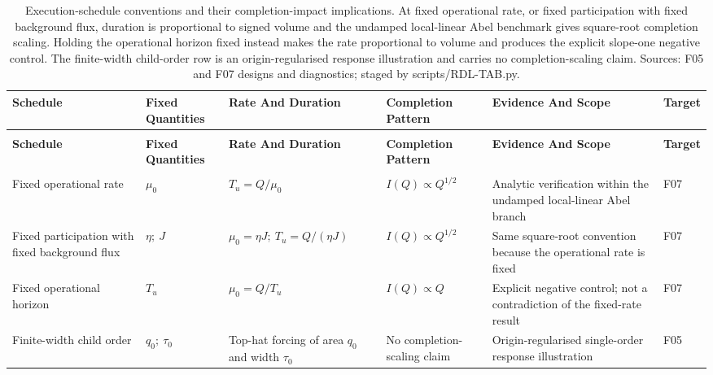 \documentclass[10pt,a4paper,landscape]{article}
\begin{document}
\footnotesize
\begin{longtable}{@{}>{\RaggedRight\arraybackslash}p{3.7cm}>{\RaggedRight\arraybackslash}p{4.0cm}>{\RaggedRight\arraybackslash}p{5.0cm}>{\RaggedRight\arraybackslash}p{4.0cm}>{\RaggedRight\arraybackslash}p{7.0cm}>{\RaggedRight\arraybackslash}p{1.5cm}@{}}
\caption{Execution-schedule conventions and their completion-impact implications. At fixed operational rate, or fixed participation with fixed background flux, duration is proportional to signed volume and the undamped local-linear Abel benchmark gives square-root completion scaling. Holding the operational horizon fixed instead makes the rate proportional to volume and produces the explicit slope-one negative control. The finite-width child-order row is an origin-regularised response illustration and carries no completion-scaling claim. Sources: F05 and F07 designs and diagnostics; staged by scripts/RDL-TAB.py.}\label{tab:rdl-t03}\\
\toprule
\textbf{Schedule} & \textbf{Fixed Quantities} & \textbf{Rate And Duration} & \textbf{Completion Pattern} & \textbf{Evidence And Scope} & \textbf{Target} \\
\midrule
\endfirsthead
\multicolumn{6}{l}{\tablename\ \thetable\ continued}\\
\toprule
\textbf{Schedule} & \textbf{Fixed Quantities} & \textbf{Rate And Duration} & \textbf{Completion Pattern} & \textbf{Evidence And Scope} & \textbf{Target} \\
\midrule
\endhead
\midrule
\multicolumn{6}{r}{Continued on next page}\\
\endfoot
\bottomrule
\endlastfoot
Fixed operational rate & \(\mu_0\) & \(T_u=Q/\mu_0\) & \(I(Q)\propto Q^{1/2}\) & Analytic verification within the undamped local-linear Abel branch & F07 \\
Fixed participation with fixed background flux & \(\eta;\ J\) & \(\mu_0=\eta J;\ T_u=Q/(\eta J)\) & \(I(Q)\propto Q^{1/2}\) & Same square-root convention because the operational rate is fixed & F07 \\
Fixed operational horizon & \(T_u\) & \(\mu_0=Q/T_u\) & \(I(Q)\propto Q\) & Explicit negative control; not a contradiction of the fixed-rate result & F07 \\
Finite-width child order & \(q_0;\ \tau_0\) & Top-hat forcing of area \(q_0\) and width \(\tau_0\) & No completion-scaling claim & Origin-regularised single-order response illustration & F05 \\
\end{longtable}
\end{document}
